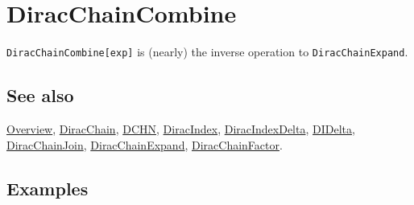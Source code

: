 \documentclass[../FeynCalcManual.tex]{subfiles}
\begin{document}
\hypertarget{diracchaincombine}{%
\section{DiracChainCombine}\label{diracchaincombine}}

\texttt{DiracChainCombine[\allowbreak{}exp]} is (nearly) the inverse
operation to \texttt{DiracChainExpand}.

\subsection{See also}

\hyperlink{toc}{Overview}, \hyperlink{diracchain}{DiracChain},
\hyperlink{dchn}{DCHN}, \hyperlink{diracindex}{DiracIndex},
\hyperlink{diracindexdelta}{DiracIndexDelta},
\hyperlink{didelta}{DIDelta},
\hyperlink{diracchainjoin}{DiracChainJoin},
\hyperlink{diracchainexpand}{DiracChainExpand},
\hyperlink{diracchainfactor}{DiracChainFactor}.

\subsection{Examples}

\begin{Shaded}
\begin{Highlighting}[]
\OperatorTok{[}\OperatorTok{[}\OperatorTok{],}\OperatorTok{,}\OperatorTok{]}\OperatorTok{[\{}\OperatorTok{,}\OperatorTok{\}]}\NormalTok{)}\SpecialCharTok{/}\NormalTok{(}\OperatorTok{[}\OperatorTok{,} \OperatorTok{]}\NormalTok{) }\SpecialCharTok{+} \SpecialCharTok{/}\NormalTok{(}\OperatorTok{[}\OperatorTok{,} \OperatorTok{]}\OperatorTok{[}\OperatorTok{,} 
     \OperatorTok{\{} \SpecialCharTok{{-}} \OperatorTok{,}\OperatorTok{\}]}\NormalTok{ (}\SpecialCharTok{{-}}\OperatorTok{[}\OperatorTok{[}\OperatorTok{],}\OperatorTok{,}\OperatorTok{]}\OperatorTok{[}\OperatorTok{,} \OperatorTok{]} \SpecialCharTok{+} \OperatorTok{[}\OperatorTok{,}\OperatorTok{,}\OperatorTok{]}\OperatorTok{[}\OperatorTok{,} \OperatorTok{]} \SpecialCharTok{+} 
\OperatorTok{[}\OperatorTok{[}\OperatorTok{],}\OperatorTok{,}\OperatorTok{]}\NormalTok{ (}\SpecialCharTok{{-}}\SpecialCharTok{\^{}} \SpecialCharTok{+}\OperatorTok{[}\OperatorTok{,} \OperatorTok{]}\NormalTok{)) }
 
\OperatorTok{[}\SpecialCharTok{\%}\OperatorTok{]}
\end{Highlighting}
\end{Shaded}
\end{document}
